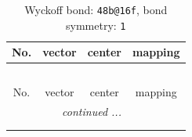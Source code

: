 \documentclass[fleqn,8pt]{jsarticle}
\begin{document}
\renewcommand{\arraystretch}{1.2}
\begin{longtable}{cccc}
\caption{Wyckoff bond: {\tt 48b@16f}, bond symmetry: {\tt 1}}
 \\
 \hline \hline
No. & vector & center & mapping \\ \hline \endfirsthead

\multicolumn{3}{l}{\tablename\ \thetable{}} \\
 \hline \hline
No. & vector & center & mapping \\ \hline \endhead

 \hline \hline
\multicolumn{3}{r}{\footnotesize\it continued ...} \\ \endfoot

 \hline \hline
\multicolumn{3}{r}{} \\ \endlastfoot


\end{longtable}
\end{document}
